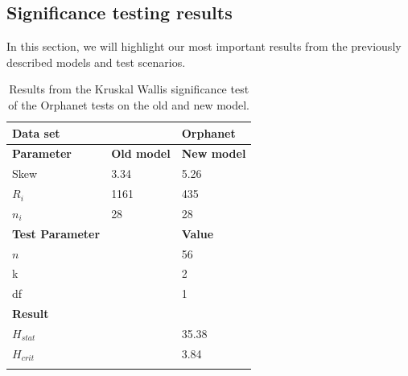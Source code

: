 \documentclass[10pt,letterpaper,final]{article}
\begin{document}

\subsection{Significance testing results}
In this section, we will highlight our most important results from the
previously described models and test scenarios.

\begin{table}[here]
\begin{center}
\begin{tabular}{lll}
    \textbf{Data set} & & \textbf{Orphanet} \\ \hline\hline
    \textbf{Parameter} & \textbf{Old model} & \textbf{New model} \\ \hline
    Skew & 3.34 & 5.26 \\
    $R_{i}$ & 1161 & 435 \\
    $n_{i}$ & 28 & 28 \\ \hline\hline
    \textbf{Test Parameter} & & \textbf{Value} \\ \hline
    $n$ && 56  \\
    k && 2  \\
    df && 1  \\ \hline \hline
    \textbf{Result} & & \\\hline
    $H_{stat}$ & & 35.38 \\
    $H_{crit}$ & & 3.84 \\
    \label{tab:orpha_old_new}
\end{tabular}
    \caption{Results from the Kruskal Wallis significance test of the
    Orphanet tests on the old and new model.}
\end{center}
\end{table}


\end{document}
